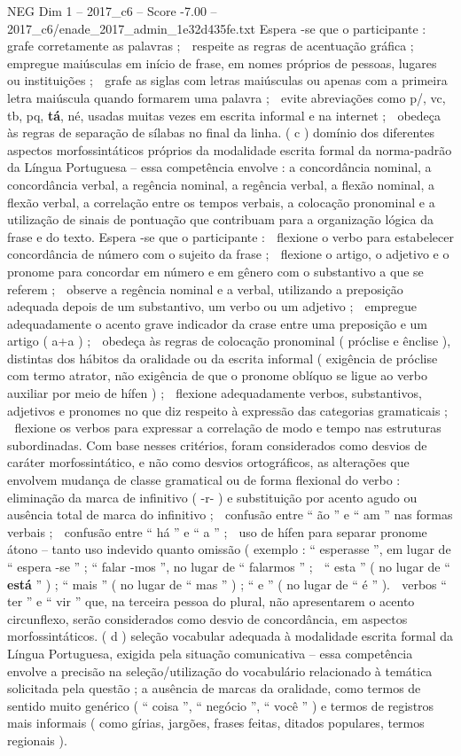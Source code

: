 \begin{textsample}{NEG Dim 1 – 2017\_c6 – Score -7.00 – 2017\_c6/enade\_2017\_admin\_1e32d435fe.txt}
Espera -se que o participante :  grafe corretamente as palavras ;  respeite as regras de acentuação gráfica ;  empregue maiúsculas em início de frase, em nomes próprios de pessoas, lugares ou instituições ;  grafe as siglas com letras maiúsculas ou apenas com a primeira letra maiúscula quando formarem uma palavra ;  evite abreviações como p/, vc, tb, pq, \textbf{tá}, né, usadas muitas vezes em escrita informal e na internet ;  obedeça às regras de separação de sílabas no final da linha. ( c ) domínio dos diferentes aspectos morfossintáticos próprios da modalidade escrita formal da norma-padrão da Língua Portuguesa – essa competência envolve : a concordância nominal, a concordância verbal, a regência nominal, a regência verbal, a flexão nominal, a flexão verbal, a correlação entre os tempos verbais, a colocação pronominal e a utilização de sinais de pontuação que contribuam para a organização lógica da frase e do texto.
Espera -se que o participante :  flexione o verbo para estabelecer concordância de número com o sujeito da frase ;  flexione o artigo, o adjetivo e o pronome para concordar em número e em gênero com o substantivo a que se referem ;  observe a regência nominal e a verbal, utilizando a preposição adequada depois de um substantivo, um verbo ou um adjetivo ;  empregue adequadamente o acento grave indicador da crase entre uma preposição e um artigo ( a+a ) ;  obedeça às regras de colocação pronominal ( próclise e ênclise ), distintas dos hábitos da oralidade ou da escrita informal ( exigência de próclise com termo atrator, não exigência de que o pronome oblíquo se ligue ao verbo auxiliar por meio de hífen ) ;  flexione adequadamente verbos, substantivos, adjetivos e pronomes no que diz respeito à expressão das categorias gramaticais ;  flexione os verbos para expressar a correlação de modo e tempo nas estruturas subordinadas.
Com base nesses critérios, foram considerados como desvios de caráter morfossintático, e não como desvios ortográficos, as alterações que envolvem mudança de classe gramatical ou de forma flexional do verbo :  eliminação da marca de infinitivo ( -r- ) e substituição por acento agudo ou ausência total de marca do infinitivo ;  confusão entre “ ão ” e “ am ” nas formas verbais ;  confusão entre “ há ” e “ a ” ;  uso de hífen para separar pronome átono – tanto uso indevido quanto omissão ( exemplo : “ esperasse ”, em lugar de “ espera -se ” ; “ falar -mos ”, no lugar de “ falarmos ” ;  “ esta ” ( no lugar de “ \textbf{está} ” ) ; “ mais ” ( no lugar de “ mas ” ) ; “ e ” ( no lugar de “ é ” ).  verbos “ ter ” e “ vir ” que, na terceira pessoa do plural, não apresentarem o acento circunflexo, serão considerados como desvio de concordância, em aspectos morfossintáticos. ( d ) seleção vocabular adequada à modalidade escrita formal da Língua Portuguesa, exigida pela situação comunicativa – essa competência envolve a precisão na seleção/utilização do vocabulário relacionado à temática solicitada pela questão ; a ausência de marcas da oralidade, como termos de sentido muito genérico ( “ coisa ”, “ negócio ”, “ você ” ) e termos de registros mais informais ( como gírias, jargões, frases feitas, ditados populares, termos regionais ).

\end{textsample}
